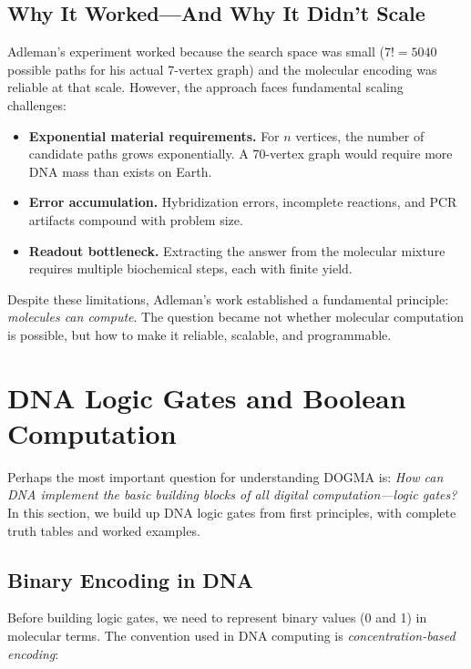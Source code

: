 \subsection{Why It Worked---And Why It Didn't Scale}

Adleman's experiment worked because the search space was small ($7! = 5040$ possible paths for his actual 7-vertex graph) and the molecular encoding was reliable at that scale. However, the approach faces fundamental scaling challenges:

\begin{itemize}[leftmargin=1.8em]
  \item \textbf{Exponential material requirements.} For $n$ vertices, the number of candidate paths grows exponentially. A 70-vertex graph would require more DNA mass than exists on Earth.
  \item \textbf{Error accumulation.} Hybridization errors, incomplete reactions, and PCR artifacts compound with problem size.
  \item \textbf{Readout bottleneck.} Extracting the answer from the molecular mixture requires multiple biochemical steps, each with finite yield.
\end{itemize}

Despite these limitations, Adleman's work established a fundamental principle: \emph{molecules can compute}. The question became not whether molecular computation is possible, but how to make it reliable, scalable, and programmable.

\section{DNA Logic Gates and Boolean Computation}
\label{sec:dna-logic-gates}

Perhaps the most important question for understanding DOGMA is: \emph{How can DNA implement the basic building blocks of all digital computation---logic gates?} In this section, we build up DNA logic gates from first principles, with complete truth tables and worked examples.

\subsection{Binary Encoding in DNA}

Before building logic gates, we need to represent binary values (0 and 1) in molecular terms. The convention used in DNA computing is \emph{concentration-based encoding}:

